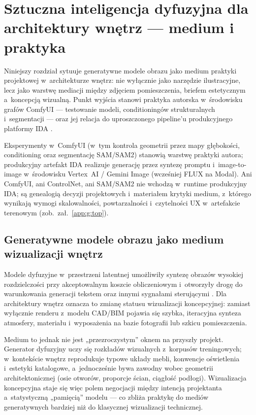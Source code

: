 \chapter{Sztuczna inteligencja dyfuzyjna dla architektury wnętrz --- medium i praktyka}
\label{ch04:top}

Niniejszy rozdział sytuuje generatywne modele obrazu jako medium praktyki projektowej w~architekturze wnętrz: nie wyłącznie jako narzędzie ilustracyjne, lecz jako warstwę mediacji między zdjęciem pomieszczenia, briefem estetycznym a~koncepcją wizualną. Punkt wyjścia stanowi praktyka autorska w~środowisku grafów ComfyUI --- testowanie modeli, conditioningów strukturalnych i~segmentacji --- oraz jej relacja do uproszczonego pipeline'u produkcyjnego platformy IDA \parencite{idaPlatform2026}.

Eksperymenty w~ComfyUI (w~tym kontrola geometrii przez mapy głębokości, conditioning oraz segmentację SAM/SAM2) stanowią warstwę praktyki autora; produkcyjny artefakt IDA realizuje generację przez syntezę promptu i~image-to-image w~środowisku Vertex~AI / Gemini Image (wcześniej FLUX na Modal). Ani ComfyUI, ani ControlNet, ani SAM/SAM2 nie wchodzą w~runtime produkcyjny IDA; są genealogią decyzji projektowych i~materiałem krytyki medium, z~którego wynikają wymogi skalowalności, powtarzalności i~czytelności UX w~artefakcie terenowym (zob.\ zał.~\ref{app:g:top}).

\section{Generatywne modele obrazu jako medium wizualizacji wnętrz}
\label{ch04:sec:genai-medium}

Modele dyfuzyjne w~przestrzeni latentnej umożliwiły syntezę obrazów wysokiej rozdzielczości przy akceptowalnym koszcie obliczeniowym i~otworzyły drogę do warunkowania generacji tekstem oraz innymi sygnałami sterującymi \parencite{rombach2022ldm}. Dla architektury wnętrz oznacza to zmianę statusu wizualizacji koncepcyjnej: zamiast wyłącznie renderu z~modelu CAD/BIM pojawia się szybka, iteracyjna synteza atmosfery, materiału i~wyposażenia na bazie fotografii lub szkicu pomieszczenia.

Medium to jednak nie jest „przezroczystym” oknem na przyszły projekt. Generator dyfuzyjny uczy się rozkładów wizualnych z~korpusów treningowych; w~kontekście wnętrz reprodukuje typowe układy mebli, konwencje oświetlenia i~estetyki katalogowe, a~jednocześnie bywa zawodny wobec geometrii architektonicznej (osie otworów, proporcje ścian, ciągłość podłogi). Wizualizacja koncepcyjna staje się więc polem negocjacji między intencją projektanta a~statystyczną „pamięcią” modelu --- co zbliża praktykę do mediów generatywnych bardziej niż do klasycznej wizualizacji technicznej.

